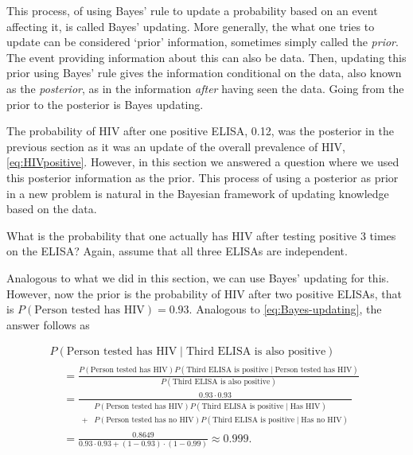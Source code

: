 \documentclass[]{book}
\theoremstyle{definition}
\theoremstyle{definition}
\theoremstyle{definition}
\theoremstyle{remark}
\let\BeginKnitrBlock\begin \let\EndKnitrBlock\end
\begin{document}
This process, of using Bayes' rule to update a probability based on an
event affecting it, is called Bayes' updating. More generally, the what
one tries to update can be considered `prior' information, sometimes
simply called the \emph{prior}. The event providing information about
this can also be data. Then, updating this prior using Bayes' rule gives
the information conditional on the data, also known as the
\emph{posterior}, as in the information \emph{after} having seen the
data. Going from the prior to the posterior is Bayes updating.

The probability of HIV after one positive ELISA, 0.12, was the posterior
in the previous section as it was an update of the overall prevalence of
HIV, \eqref{eq:HIVpositive}. However, in this section we answered a
question where we used this posterior information as the prior. This
process of using a posterior as prior in a new problem is natural in the
Bayesian framework of updating knowledge based on the data.

\BeginKnitrBlock{example}
\protect\hypertarget{exm:unnamed-chunk-6}{}{\label{exm:unnamed-chunk-6}
}What is the probability that one actually has HIV after testing
positive 3 times on the ELISA? Again, assume that all three ELISAs are
independent.
\EndKnitrBlock{example}

Analogous to what we did in this section, we can use Bayes' updating for
this. However, now the prior is the probability of HIV after two
positive ELISAs, that is \(P(\text{Person tested has HIV}) = 0.93\).
Analogous to \eqref{eq:Bayes-updating}, the answer follows as

\begin{multline*}
  P(\text{Person tested has HIV} \mid \text{Third ELISA is also positive}) \\
  \begin{split}
  &= \frac{P(\text{Person tested has HIV}) P(\text{Third ELISA is positive} \mid \text{Person tested has HIV})}{P(\text{Third ELISA is also positive})} \\
  &= \frac{0.93 \cdot 0.93}{\begin{split}
  &P(\text{Person tested has HIV}) P(\text{Third ELISA is positive} \mid \text{Has HIV}) \\
  + &P(\text{Person tested has no HIV}) P(\text{Third ELISA is positive} \mid \text{Has no HIV})
  \end{split}} \\
  &= \frac{0.8649}{0.93 \cdot 0.93 + (1 - 0.93)\cdot (1 - 0.99)} \approx 0.999.
  \end{split}
\end{multline*}
\end{document}
